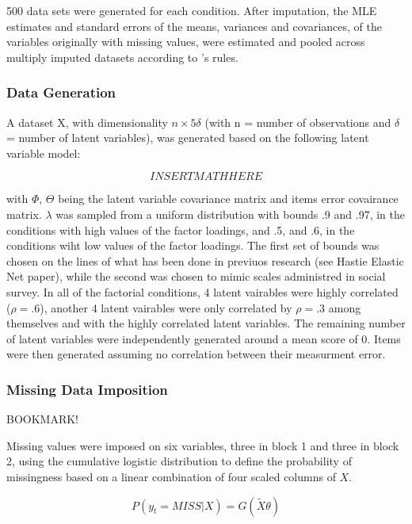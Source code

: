 500 data sets were generated for each condition. After imputation, the MLE estimates and standard errors of 
the means, variances and covariances, of the variables originally with missing values, were estimated and 
pooled across multiply imputed datasets according to \citet{rubin:1987}'s rules.

\subsubsection{Data Generation}

A dataset X, with dimensionality $n \times 5\delta$ (with n = number of observations and $\delta$ = number 
of latent variables), was generated based on the following latent variable model:

\begin{equation}
	INSERT MATH HERE
\end{equation}

with $\Phi$, $\Theta$ being the latent variable covariance matrix and items error covairance matrix.
$\lambda$ was sampled from a uniform distribution with bounds .9 and .97, in the conditions with 
high values of the factor loadings, and .5, and .6, in the conditions wiht low values of the factor loadings.
The first set of bounds was chosen on the lines of what has been done in previuos research (see Hastie Elastic 
Net paper), while the second was chosen to mimic scales administred in social survey.
In all of the factorial conditions, 4 latent vairables were highly correlated ($\rho = .6$), another
4 latent vairables were only correlated by $\rho = .3$ among themselves and with the highly correlated latent
variables. The remaining number of latent variables were independently generated around a mean score of 0.
Items were then generated assuming no correlation between their measurment error.

\subsubsection{Missing Data Imposition}

BOOKMARK!

Missing values were imposed on six variables, three in block 1 and three in block 2, using the cumulative logistic distribution
to define the probability of missingness based on a linear combination of four scaled columns of $X$.

\begin{equation}
	P(y_t = MISS | X) = G(\tilde{X} \theta) \label{eq:PBT_imp}
\end{equation}

